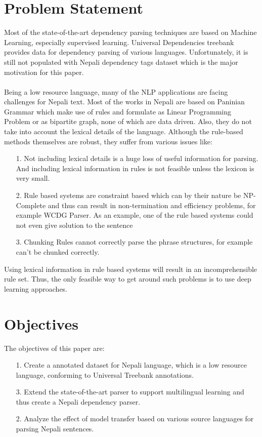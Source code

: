 \section {Problem Statement}
Most of the state-of-the-art dependency parsing techniques are based on
Machine Learning, especially supervised learning.  Universal Dependencies
\cite{nivreUD} treebank provides data for dependency parsing of various
languages. Unfortunately, it is still not populated with Nepali dependency
tags dataset which is the major motivation for this paper.
\\~\\
Being a low resource language, many of the NLP applications are facing
challenges for Nepali text. Most of the works in Nepali are based on Paninian
Grammar \cite{paninianEng,yajnik1,yajnik2} which make use of
rules\cite{balCompGrammar} and formulate as Linear Programming
Problem\cite{yajnik2} or as bipartite graph\cite{yajnik1}, none of which are
data driven. Also, they do not take into account the lexical details of the
language. Although the rule-based methods themselves are robust, they suffer
from various issues like:
\begin{itemize}
    \item[1.] Not including lexical details is a huge loss of useful
        information for parsing. And including lexical information in rules is
        not feasible unless the lexicon is very small.
    \item[2.] Rule based systems are constraint based which can by their nature
        be NP-Complete and thus can result in non-termination and efficiency
        problems, for example WCDG Parser\cite{compareRuleStatistical}. As an
        example, one of the rule based systems could not even give solution to the sentence
    \item[3.] Chunking Rules cannot correctly parse the phrase structures, for
        example  can't be chunked correctly.
\end{itemize}
Using lexical information in rule based systems will result in an
incomprehensible rule set. Thus, the only feasible way to get around such
problems is to use deep learning approaches.

\section {Objectives}
The objectives of this paper are:
\begin{itemize}
    \item[1.] Create a annotated dataset for Nepali language, which is a low resource language, conforming to Universal Treebank annotations.
    \item[3.] Extend the state-of-the-art parser to support multilingual learning and thus create a Nepali dependency parser.
    \item[2.] Analyze the effect of model transfer based on various source languages for parsing Nepali sentences.
\end{itemize}

